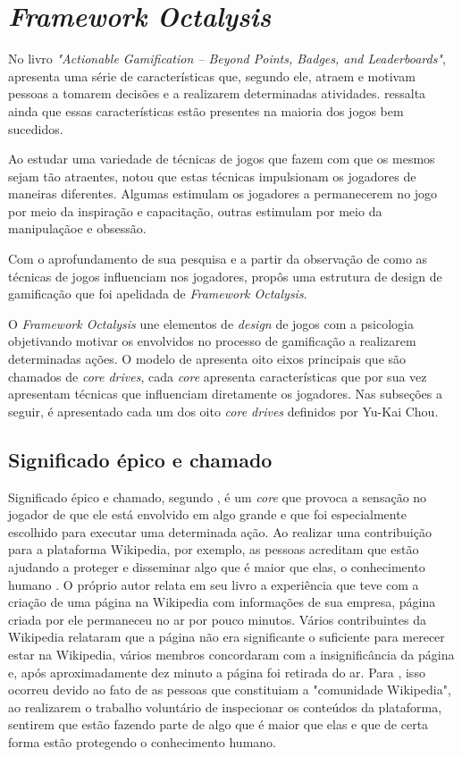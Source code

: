 \section{\textit{Framework Octalysis}}
No livro \textit{"Actionable Gamification – Beyond Points, Badges, and Leaderboards"},  apresenta uma série
de características que, segundo ele, atraem e motivam pessoas a tomarem decisões e a realizarem determinadas atividades.
 ressalta ainda que essas características estão presentes na maioria dos jogos bem sucedidos.

Ao estudar uma variedade de técnicas de jogos que fazem com que os mesmos sejam tão atraentes,  notou que estas 
técnicas impulsionam os jogadores de maneiras diferentes. Algumas estimulam os jogadores a permanecerem no jogo por meio da
inspiração e capacitação, outras estimulam por meio da manipulaçãoe e obsessão.

Com o aprofundamento de sua pesquisa e a partir da observação de como as técnicas de jogos influenciam nos jogadores,  
propôs uma estrutura de design de gamificação que foi apelidada de  \textit{Framework Octalysis}.

O \textit{Framework Octalysis} une elementos de \textit{design} de jogos com a psicologia objetivando motivar os envolvidos
no processo de gamificação a realizarem determinadas ações. O modelo de  apresenta oito eixos principais que 
são chamados de \textit{core drives}, cada \textit{core} apresenta características que por sua vez apresentam técnicas que
influenciam diretamente os jogadores. Nas subseções a seguir, é apresentado cada um dos oito \textit{core drives}
definidos por Yu-Kai Chou.

\subsection{Significado épico e chamado}
Significado épico e chamado, segundo , é um \textit{core} que provoca a sensação no jogador de que ele está envolvido em algo 
grande e que foi especialmente escolhido para executar uma determinada ação. Ao realizar uma contribuição para a plataforma Wikipedia, por exemplo,
as pessoas acreditam que estão ajudando a proteger e disseminar algo que é maior que elas, o conhecimento humano \cite{chou2017actionable}. O próprio autor relata 
em seu livro a experiência que teve com a criação de uma página na Wikipedia com informações de sua empresa, página criada por ele permaneceu no ar por pouco minutos.
Vários contribuintes da Wikipedia relataram que a página não era significante o suficiente para merecer estar na Wikipedia, vários membros concordaram com
a insignificância da página e, após aproximadamente dez minuto a página foi retirada do ar. Para , isso 
ocorreu devido ao fato de as pessoas que constituiam a "comunidade Wikipedia", ao realizarem o trabalho voluntário de inspecionar os conteúdos da plataforma, sentirem
que estão fazendo parte de algo que é maior que elas e que de certa forma estão protegendo o conhecimento humano.

